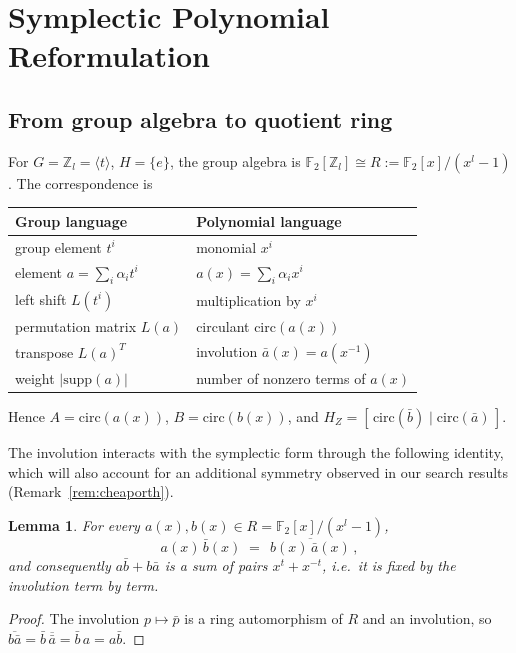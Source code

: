 \documentclass[journal,onecolumn]{IEEEtran}
\newtheorem{lemma}[theorem]{Lemma}
\theoremstyle{definition}
\theoremstyle{remark}
\newcommand{\F}{\mathbb{F}}
\newcommand{\Z}{\mathbb{Z}}
\newcommand{\supp}{\mathrm{supp}}
\newcommand{\invol}[1]{\bar{#1}}
\begin{document}
\section{Symplectic Polynomial Reformulation}\label{sec:poly}
\subsection{From group algebra to quotient ring}
For $G=\Z_l=\langle t\rangle$, $H=\{e\}$, the group algebra is
$\F_2[\Z_l]\cong R:=\F_2[x]/(x^l-1)$. The correspondence is
\begin{center}
\begin{tabular}{@{}ll@{}}
\toprule
Group language & Polynomial language \\
\midrule
group element $t^{i}$ & monomial $x^{i}$ \\
element $a=\sum_i\alpha_i t^{i}$ & $a(x)=\sum_i\alpha_i x^{i}$ \\
left shift $L(t^{i})$ & multiplication by $x^{i}$ \\
permutation matrix $L(a)$ & circulant $\mathrm{circ}(a(x))$ \\
transpose $L(a)^{T}$ & involution $\invol{a}(x)=a(x^{-1})$ \\
weight $|\supp(a)|$ & number of nonzero terms of $a(x)$ \\
\bottomrule
\end{tabular}
\end{center}
Hence $A=\mathrm{circ}(a(x))$, $B=\mathrm{circ}(b(x))$, and
$H_Z=[\,\mathrm{circ}(\invol{b})\mid\mathrm{circ}(\invol{a})\,]$.

The involution interacts with the symplectic form through the following
identity, which will also account for an additional symmetry observed in our
search results (Remark~\ref{rem:cheaporth}).

\begin{lemma}\label{lem:reciprocity}
For every $a(x),b(x)\in R=\F_2[x]/(x^l-1)$,
\[
a(x)\,\invol{b}(x)\;=\;\overline{\,b(x)\,\invol{a}(x)\,},
\]
and consequently $a\invol{b}+b\invol{a}$ is a sum of pairs
$x^{t}+x^{-t}$, i.e.\ it is fixed by the involution term by term.
\end{lemma}
\begin{proof}
The involution $p\mapsto\invol p$ is a ring automorphism of $R$ and an
involution, so
$\overline{b\invol{a}}=\invol{b}\,\overline{\invol{a}}
 =\invol{b}\,a=a\invol{b}$.
\end{proof}
\end{document}
